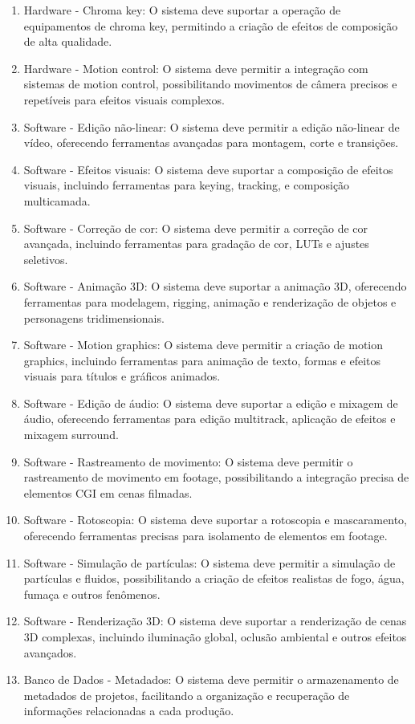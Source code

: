 \begin{enumerate}
  \item Hardware - Chroma key: O sistema deve suportar a operação de equipamentos de chroma key, permitindo a criação de efeitos de composição de alta qualidade.
  \item Hardware - Motion control: O sistema deve permitir a integração com sistemas de motion control, possibilitando movimentos de câmera precisos e repetíveis para efeitos visuais complexos.
  \item Software - Edição não-linear: O sistema deve permitir a edição não-linear de vídeo, oferecendo ferramentas avançadas para montagem, corte e transições.
  \item Software - Efeitos visuais: O sistema deve suportar a composição de efeitos visuais, incluindo ferramentas para keying, tracking, e composição multicamada.
  \item Software - Correção de cor: O sistema deve permitir a correção de cor avançada, incluindo ferramentas para gradação de cor, LUTs e ajustes seletivos.
  \item Software - Animação 3D: O sistema deve suportar a animação 3D, oferecendo ferramentas para modelagem, rigging, animação e renderização de objetos e personagens tridimensionais.
  \item Software - Motion graphics: O sistema deve permitir a criação de motion graphics, incluindo ferramentas para animação de texto, formas e efeitos visuais para títulos e gráficos animados.
  \item Software - Edição de áudio: O sistema deve suportar a edição e mixagem de áudio, oferecendo ferramentas para edição multitrack, aplicação de efeitos e mixagem surround.
  \item Software - Rastreamento de movimento: O sistema deve permitir o rastreamento de movimento em footage, possibilitando a integração precisa de elementos CGI em cenas filmadas.
  \item Software - Rotoscopia: O sistema deve suportar a rotoscopia e mascaramento, oferecendo ferramentas precisas para isolamento de elementos em footage.
  \item Software - Simulação de partículas: O sistema deve permitir a simulação de partículas e fluidos, possibilitando a criação de efeitos realistas de fogo, água, fumaça e outros fenômenos.
  \item Software - Renderização 3D: O sistema deve suportar a renderização de cenas 3D complexas, incluindo iluminação global, oclusão ambiental e outros efeitos avançados.
  \item Banco de Dados - Metadados: O sistema deve permitir o armazenamento de metadados de projetos, facilitando a organização e recuperação de informações relacionadas a cada produção.

\end{enumerate}
